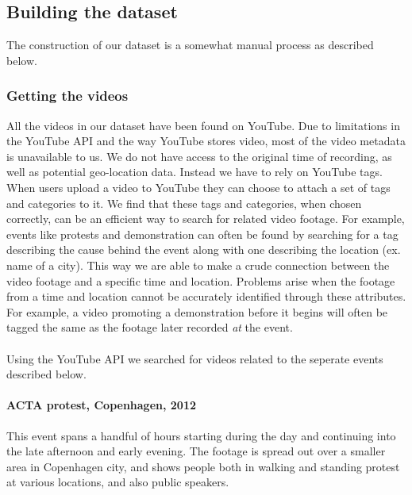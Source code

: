 \subsection{Building the dataset}
%
The construction of our dataset is a somewhat manual process as described below. %
%
\subsubsection{Getting the videos}
%
All the videos in our dataset have been found on YouTube. Due to limitations in the YouTube API and the way YouTube stores video, most of the video metadata is unavailable to us. We do not have access to the original time of recording, as well as potential geo-location data. Instead we have to rely on YouTube tags. When users upload a video to YouTube they can choose to attach a set of tags and categories to it. We find that these tags and categories, when chosen correctly, can be an efficient way to search for related video footage. For example, events like protests and demonstration can often be found by searching for a tag describing the cause behind the event along with one describing the location (ex. name of a city). This way we are able to make a crude connection between the video footage and a specific time and location. Problems arise when the footage from a time and location cannot be accurately identified through these attributes. For example, a video promoting a demonstration before it begins will often be tagged the same as the footage later recorded \emph{at} the event.\\\\ %
%
Using the YouTube API we searched for videos related to the seperate events described below.
%
\paragraph{ACTA protest, Copenhagen, 2012}
%
This event spans a handful of hours starting during the day and continuing into the late afternoon and early evening. The footage is spread out over a smaller area in Copenhagen city, and shows people both in walking and standing protest at various locations, and also public speakers.
%
